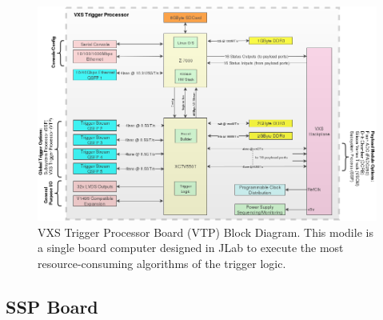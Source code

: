 \begin{figure}[hbt]
	\centering
	\includegraphics[width=1.0\columnwidth,keepaspectratio]{img/vtp_block_daq.png}
	\caption{VXS Trigger Processor Board (VTP) Block Diagram. This modile is a single board computer designed in JLab to execute the most resource-consuming algorithms of the trigger logic.}
	\label{fig:vtp_block_daq}
\end{figure}


\subsection{SSP Board}
\label{sec:ssp_board}

